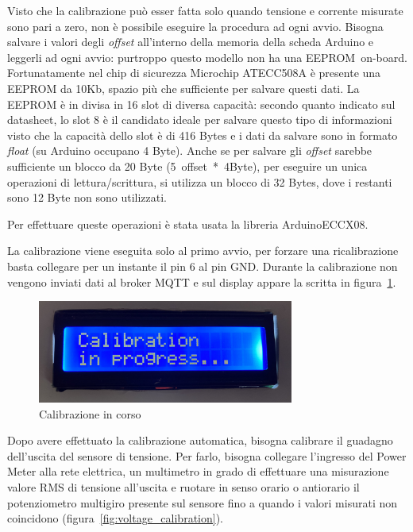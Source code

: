 \documentclass[italian,12pt,a4paper,oneside,final]{report}
\begin{document}
Visto che la calibrazione può esser fatta solo quando tensione e corrente misurate sono pari a zero, non è possibile eseguire la procedura ad ogni avvio.
Bisogna salvare i valori degli \textit{offset} all'interno della memoria della scheda Arduino e leggerli ad ogni avvio: purtroppo questo modello non ha una \mbox{EEPROM on-board}.
Fortunatamente nel chip di sicurezza Microchip ATECC508A è presente una EEPROM da 10Kb, spazio più che sufficiente per salvare questi dati.
La EEPROM è in divisa in 16 slot di diversa capacità: secondo quanto indicato sul datasheet, lo slot 8 è il candidato ideale per salvare questo tipo di informazioni visto che la capacità dello slot è di 416 Bytes e i dati da salvare sono in formato \textit{float} (su Arduino occupano 4 Byte).
Anche se per salvare gli \textit{offset} sarebbe sufficiente un blocco da 20 Byte \mbox{(5 offset * 4Byte)}, per eseguire un unica operazioni di lettura/scrittura, si utilizza un blocco di 32 Bytes, dove i restanti sono 12 Byte non sono utilizzati.

\noindent Per effettuare queste operazioni è stata usata la libreria ArduinoECCX08.

La calibrazione viene eseguita solo al primo avvio, per forzare una ricalibrazione basta collegare per un instante il pin 6 al pin GND.
Durante la calibrazione non vengono inviati dati al broker MQTT e sul display appare la scritta in figura~\ref{fig:calibration_in_progress}.

\begin{figure}[h]
	\centering
	\includegraphics[width=0.75\textwidth]{calibration_in_progress.jpg}
	\caption{Calibrazione in corso}
	\label{fig:calibration_in_progress}
\end{figure}

Dopo avere effettuato la calibrazione automatica, bisogna calibrare il guadagno dell'uscita del sensore di tensione.
Per farlo, bisogna collegare l'ingresso del Power Meter alla rete elettrica, un multimetro in grado di effettuare una misurazione valore RMS di tensione all'uscita e ruotare in senso orario o antiorario il potenziometro multigiro presente sul sensore fino a quando i valori misurati non coincidono (figura~\ref{fig:voltage_calibration}).
\end{document}
